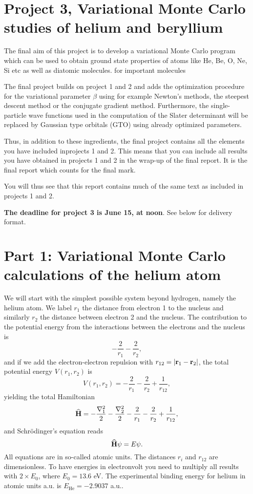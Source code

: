 \documentclass[10pt]{article}
\newcommand{\be}{\begin{equation}}
\newcommand{\ee}{\end{equation}}
\newcommand{\OP}[1]{{\bf\widehat{#1}}}
\begin{document}
\section*{Project 3, Variational Monte Carlo studies of helium and beryllium}

The final aim of this project is to develop a variational Monte Carlo program which can be used to obtain ground state properties of atoms like He, Be, O, Ne, Si etc as well as diatomic molecules. 
for important molecules 

The final project builds on project 1 and 2 and adds the optimization procedure for the variational parameter $\beta$ using for example Newton's methods, the steepest descent method or the conjugate gradient method. 
Furthermore, the single-particle wave functions used in the computation
of the Slater determinant will be replaced by Gaussian type orbitals (GTO) using already optimized parameters. 

Thus, in addition to these ingredients, the final project contains all the elements you have included inprojects 1 and 2. This means that you can include all results you have obtained in projects 1 and 2 in the wrap-up of the final report. It is the final report which counts for the final mark.

You will thus see that this report contains much of the same text as included in projects 1 and 2. 

{\bf The deadline for project 3 is June 15, at noon}.  See below for delivery format.



\section*{Part 1: Variational Monte Carlo calculations of the helium atom}

We will start with the simplest possible system beyond hydrogen, namely the helium atom.
We label $r_1$ the distance from electron 1 to the nucleus and similarly 
$r_2$ the distance between electron 2 and the nucleus.
The contribution to the potential energy from the interactions between the 
electrons and the nucleus is
\be
   -\frac{2}{r_1}-\frac{2}{r_2},
\ee 
and if we add the electron-electron repulsion with
$r_{12}=|{\bf r}_1-{\bf r}_2|$, the total potential energy 
$V(r_1, r_2)$ is
\be
 V(r_1, r_2)=-\frac{2}{r_1}-\frac{2}{r_2}+
               \frac{1}{r_{12}},
\ee
yielding the total Hamiltonian
\be
   \OP{H}=-\frac{\nabla_1^2}{2}-\frac{\nabla_2^2}{2}
          -\frac{2}{r_1}-\frac{2}{r_2}+
               \frac{1}{r_{12}},
\ee
and Schr\"odinger's equation reads
\be
   \OP{H}\psi=E\psi.
\ee
All equations are in so-called atomic units. The distances
$r_i$ and $r_{12}$ are dimensionless. To have energies in electronvolt
you need to multiply all results with 
$2\times E_0$,
where $E_0=13.6$ eV.
The experimental binding energy for helium in atomic units a.u. is $E_{\mathrm{He}}=-2.9037$ a.u..
\end{document}
